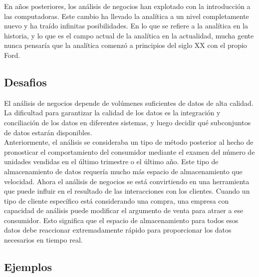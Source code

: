 \documentclass[preprint,12pt]{elsarticle}
\begin{document}
	En años posteriores, los análisis de negocios han explotado con la introducción a las computadoras. Este cambio ha llevado la analítica a un nivel completamente nuevo y ha traído infinitas posibilidades. En lo que se refiere a la analítica en la historia, y lo que es el campo actual de la analítica en la actualidad, mucha gente nunca pensaría que la analítica comenzó a principios del siglo XX con el propio Ford.
	
	\subsection{Desafios}
	El análisis de negocios depende de volúmenes suficientes de datos de alta calidad. La dificultad para garantizar la calidad de los datos es la integración y conciliación de los datos en diferentes sistemas, y luego decidir qué subconjuntos de datos estarán disponibles. \\
	
	Anteriormente, el análisis se consideraba un tipo de método posterior al hecho de pronosticar el comportamiento del consumidor mediante el examen del número de unidades vendidas en el último trimestre o el último año. Este tipo de almacenamiento de datos requería mucho más espacio de almacenamiento que velocidad. Ahora el análisis de negocios se está convirtiendo en una herramienta que puede influir en el resultado de las interacciones con los clientes. Cuando un tipo de cliente específico está considerando una compra, una empresa con capacidad de análisis puede modificar el argumento de venta para atraer a ese consumidor. Esto significa que el espacio de almacenamiento para todos esos datos debe reaccionar extremadamente rápido para proporcionar los datos necesarios en tiempo real.
	
	\newpage
	
	\subsection{Ejemplos \\}
		
\end{document}
